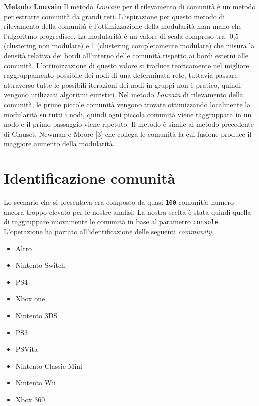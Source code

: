 			\textbf{Metodo Louvain}
				Il metodo \textit{Louvain} per il rilevamento di comunità è un metodo per estrarre comunità da grandi reti. L'ispirazione per questo metodo di rilevamento della comunità è l'ottimizzazione della modularità man mano che l'algoritmo progredisce. La modularità è un valore di scala compreso tra -0,5 (clustering non modulare) e 1 (clustering completamente modulare) che misura la densità relativa dei bordi all'interno delle comunità rispetto ai bordi esterni alle comunità. L'ottimizzazione di questo valore si traduce teoricamente nel migliore raggruppamento possibile dei nodi di una determinata rete, tuttavia passare attraverso tutte le possibili iterazioni dei nodi in gruppi non è pratico, quindi vengono utilizzati algoritmi euristici. Nel metodo \textit{Louvain} di rilevamento della comunità, le prime piccole comunità vengono trovate ottimizzando localmente la modularità su tutti i nodi, quindi ogni piccola comunità viene raggruppata in un nodo e il primo passaggio viene ripetuto. Il metodo è simile al metodo precedente di Clauset, Newman e Moore [3] che collega le comunità la cui fusione produce il maggiore aumento della modularità.
		
		\section{Identificazione comunità}
			Lo scenario che si presentava era composto da quasi \verb|100| comunità; numero ancora troppo elevato per le nostre analisi. La nostra scelta è stata quindi quella di raggruppare nuovamente le comunità in base al parametro \verb|console|. L'operazione ha portato all'identificazione delle seguenti \textit{community}
			\begin{itemize}			
				\item Altro
				\item Nintento Switch
				\item PS4
				\item Xbox one
				\item Nintento 3DS
				\item PS3
				\item PSVita
				\item Nintento Classic Mini
				\item Nintento Wii
				\item Xbox 360
			\end{itemize}
			